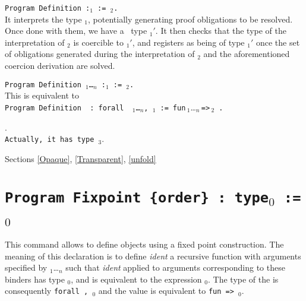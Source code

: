\begin{Variants}
\item {\tt Program Definition {\ident} {\tt :}{\term$_1$} :=
    {\term$_2$}.}\\
  It interprets the type {\term$_1$}, potentially generating proof
  obligations to be resolved. Once done with them, we have a \Coq\ type
  {\term$_1'$}. It then checks that the type of the interpretation of
  {\term$_2$} is coercible to {\term$_1'$}, and registers {\ident} as
  being of type {\term$_1'$} once the set of obligations generated
  during the interpretation of {\term$_2$} and the aforementioned
  coercion derivation are solved.
\item {\tt Program Definition {\ident} {\binder$_1$}\ldots{\binder$_n$}
       {\tt :}\term$_1$ {\tt :=} {\term$_2$}.}\\
  This is equivalent to \\
   {\tt Program Definition\,{\ident}\,{\tt :\,forall}\,%
       {\binder$_1$}\ldots{\binder$_n$}{\tt ,}\,\term$_1$\,{\tt :=}}\,%
       {\tt fun}\,{\binder$_1$}\ldots{\binder$_n$}\,{\tt =>}\,{\term$_2$}\,%
       {\tt .}
\end{Variants}

\begin{ErrMsgs}
\item {}.\\
    \texttt{Actually, it has type {\term$_3$}}.
\end{ErrMsgs}

\SeeAlso Sections \ref{Opaque}, \ref{Transparent}, \ref{unfold}

\section{\tt Program Fixpoint {\ident} {\params} {\tt \{order\}} : type$_0$ := \term$_0$ 
  \label{ProgramFixpoint}}

This command allows to define objects using a fixed point
construction. The meaning of this declaration is to define {\it ident}
a recursive function with arguments specified by
{\binder$_1$}\ldots{\binder$_n$} such that {\it ident} applied to
arguments corresponding to these binders has type \type$_0$, and is
equivalent to the expression \term$_0$. The type of the {\ident} is
consequently {\tt forall {\params} {\tt,} \type$_0$}
and the value is equivalent to {\tt fun {\params} {\tt =>} \term$_0$}.

